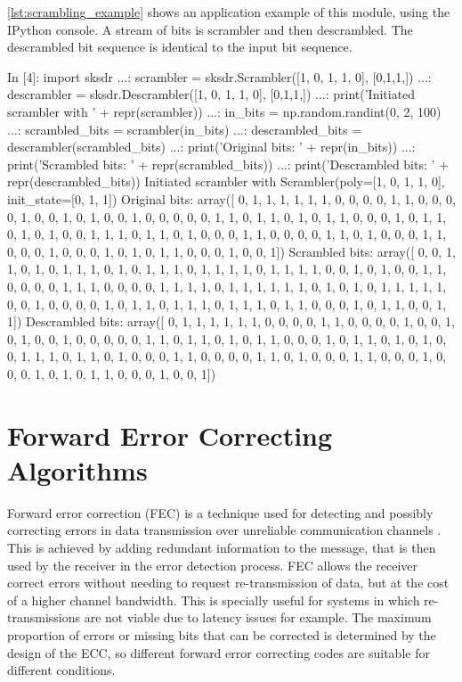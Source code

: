 \autoref{lst:scrambling_example} shows an application example of this module, using the IPython console. A stream of bits is scrambler and then descrambled. The descrambled bit sequence is identical to the input bit sequence.
\begin{python}[label={lst:scrambling_example},caption={Scrambling and Descrambling example}]
  In [4]: import sksdr
  ...: scrambler = sksdr.Scrambler([1, 0, 1, 1, 0], [0,1,1,])
  ...: descrambler = sksdr.Descrambler([1, 0, 1, 1, 0], [0,1,1,])
  ...: print('Initiated scrambler with ' + repr(scrambler))
  ...: in_bits = np.random.randint(0, 2, 100)
  ...: scrambled_bits = scrambler(in_bits)
  ...: descrambled_bits = descrambler(scrambled_bits)
  ...: print('Original bits: ' + repr(in_bits))
  ...: print('Scrambled bits: ' + repr(scrambled_bits))
  ...: print('Descrambled bits: ' + repr(descrambled_bits))
Initiated scrambler with Scrambler(poly=[1, 0, 1, 1, 0], init_state=[0, 1, 1])
Original bits: array([
      0, 1, 1, 1, 1, 1, 1, 0, 0, 0, 0, 1, 1, 0, 0, 0, 0, 1, 0, 0, 1, 0,
      1, 0, 0, 1, 0, 0, 0, 0, 0, 1, 1, 0, 1, 1, 0, 1, 0, 1, 1, 0, 0, 0,
      1, 0, 1, 1, 0, 1, 0, 1, 0, 0, 1, 1, 1, 0, 1, 1, 0, 1, 0, 0, 0, 1,
      1, 0, 0, 0, 0, 1, 1, 0, 1, 0, 0, 0, 1, 1, 0, 0, 0, 1, 0, 0, 0, 1,
      0, 1, 0, 1, 1, 0, 0, 0, 1, 0, 0, 1])
Scrambled bits: array([
      0, 0, 1, 1, 0, 1, 0, 1, 1, 1, 0, 1, 0, 1, 1, 1, 0, 1, 1, 1, 1, 0,
      1, 1, 1, 1, 0, 0, 1, 0, 1, 0, 0, 1, 1, 0, 0, 0, 0, 1, 1, 1, 0, 0,
      0, 0, 1, 1, 1, 1, 0, 1, 1, 1, 1, 1, 1, 0, 1, 0, 1, 0, 1, 1, 1, 1,
      1, 0, 0, 1, 0, 0, 0, 0, 1, 0, 1, 1, 0, 1, 1, 1, 0, 1, 1, 1, 0, 1,
      1, 0, 0, 0, 1, 0, 1, 1, 0, 0, 1, 1])
Descrambled bits: array([
      0, 1, 1, 1, 1, 1, 1, 0, 0, 0, 0, 1, 1, 0, 0, 0, 0, 1, 0, 0, 1, 0,
      1, 0, 0, 1, 0, 0, 0, 0, 0, 1, 1, 0, 1, 1, 0, 1, 0, 1, 1, 0, 0, 0,
      1, 0, 1, 1, 0, 1, 0, 1, 0, 0, 1, 1, 1, 0, 1, 1, 0, 1, 0, 0, 0, 1,
      1, 0, 0, 0, 0, 1, 1, 0, 1, 0, 0, 0, 1, 1, 0, 0, 0, 1, 0, 0, 0, 1,
      0, 1, 0, 1, 1, 0, 0, 0, 1, 0, 0, 1])
\end{python}

\section{Forward Error Correcting Algorithms}
Forward error correction (FEC) is a technique used for detecting and possibly correcting errors in data transmission over unreliable communication channels \cite{wikipedia_fec}. This is achieved by adding redundant information to the message, that is then used by the receiver in the error detection process. FEC allows the receiver correct errors without needing to request re-transmission of data, but at the cost of a higher channel bandwidth. This is specially useful for systems in which re-transmissions are not viable due to latency issues for example.
The maximum proportion of errors or missing bits that can be corrected is determined by the design of the ECC, so different forward error correcting codes are suitable for different conditions.

